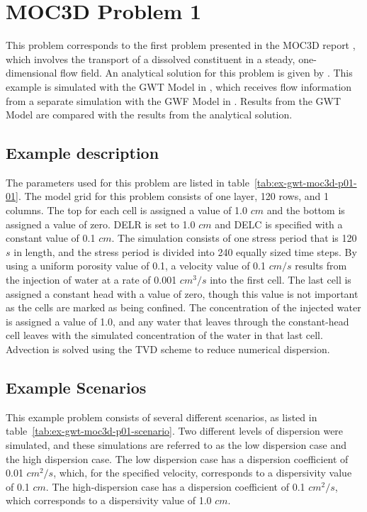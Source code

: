 \section{MOC3D Problem 1}

This problem corresponds to the first problem presented in the MOC3D report \cite{konikow1996three}, which involves the transport of a dissolved constituent in a steady, one-dimensional flow field.  An analytical solution for this problem is given by \cite{wexler1992}.  This example is simulated with the GWT Model in \mf, which receives flow information from a separate simulation with the GWF Model in \mf.  Results from the GWT Model are compared with the results from the \cite{wexler1992} analytical solution.  

\subsection{Example description}

The parameters used for this problem are listed in table~\ref{tab:ex-gwt-moc3d-p01-01}.  The model grid for this problem consists of one layer, 120 rows, and 1 columns.  The top for each cell is assigned a value of 1.0 $cm$ and the bottom is assigned a value of zero.  DELR is set to 1.0 $cm$ and DELC is specified with a constant value of 0.1 $cm$.  The simulation consists of one stress period that is 120 $s$ in length, and the stress period is divided into 240 equally sized time steps.  By using a uniform porosity value of 0.1, a velocity value of 0.1 $cm/s$ results from the injection of water at a rate of 0.001 $cm^3/s$ into the first cell.  The last cell is assigned a constant head with a value of zero, though this value is not important as the cells are marked as being confined.  The concentration of the injected water is assigned a value of 1.0, and any water that leaves through the constant-head cell leaves with the simulated concentration of the water in that last cell.   Advection is solved using the TVD scheme to reduce numerical dispersion.



\subsection{Example Scenarios}

This example problem consists of several different scenarios, as listed in table~\ref{tab:ex-gwt-moc3d-p01-scenario}.  Two different levels of dispersion were simulated, and these simulations are referred to as the low dispersion case and the high dispersion case.  The low dispersion case has a dispersion coefficient of 0.01 $cm^2/s$, which, for the specified velocity, corresponds to a dispersivity value of 0.1 $cm$.  The high-dispersion case has a dispersion coefficient of 0.1 $cm^2/s$, which corresponds to a dispersivity value of 1.0 $cm$.

